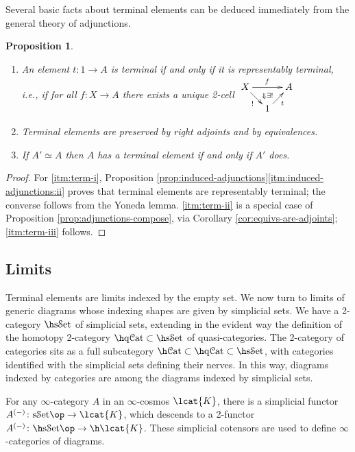 \documentclass[12pt,reqno]{amsart}
\theoremstyle{plain}
\newtheorem{prop}[thm]{Proposition}
\theoremstyle{definition}
\theoremstyle{remark}
\numberwithin{equation}{subsection}
\renewcommand{\Cat}{\mathcal{C}\mathrm{at}}
\renewcommand{\sSet}{\mathrm{s}\mathcal{S}\mathrm{et}}
\renewcommand{\qCat}{\mathrm{q}\mathcal{C}\mathrm{at}}
\begin{document}
Several basic facts about terminal elements can be deduced immediately from the general theory of adjunctions.

\begin{prop}$\quad$
\begin{enumerate}[label=(\roman*)]
\item\label{itm:term-i} An element $t \colon 1 \to A$ is terminal if and only if it is representably terminal, i.e., if for all $f \colon X \to A$ there exists a unique 2-cell $\vcenter{\xymatrix@=1em{ X \ar[rr]^f \ar[dr]_{!} & \ar@{}[d]|(.4){\Downarrow\exists!} & A \\ & 1 \ar[ur]_t}}$
\item\label{itm:term-ii} Terminal elements are preserved by right adjoints and by equivalences.
\item\label{itm:term-iii} If  $A' \simeq A$ then $A$ has a terminal element if and only if $A'$ does.
\end{enumerate}
\end{prop}
\begin{proof}
For \ref{itm:term-i}, Proposition \ref{prop:induced-adjunctions}\ref{itm:induced-adjunctions:ii} proves that terminal elements are representably terminal; the converse follows from the Yoneda lemma. \ref{itm:term-ii} is a special case of Proposition \ref{prop:adjunctions-compose}, via Corollary \ref{cor:equivs-are-adjoints}; \ref{itm:term-iii} follows.
\end{proof}

\subsection{Limits}


Terminal elements are limits indexed by the empty set. We now turn to limits of generic diagrams whose indexing shapes are given by simplicial sets. We have a 2-category $\h\sSet$ of simplicial sets, extending in the evident way the definition of the homotopy 2-category $\h\qCat \subset \h\sSet$ of quasi-categories. The 2-category of categories sits as a full subcategory $\h\Cat\subset\h\qCat \subset \h\sSet$, with categories identified with the simplicial sets defining their nerves. In this way, diagrams indexed by categories are among the diagrams indexed by simplicial sets. 

For any $\infty$-category $A$ in an $\infty$-cosmos $\lcat{K}$, there is a simplicial functor $A^{(-)} \colon \sSet\op \to \lcat{K}$, which descends to a 2-functor $A^{(-)} \colon \h\sSet\op \to \h\lcat{K}$. These simplicial cotensors are used to define $\infty$-categories of diagrams. 
\end{document}

